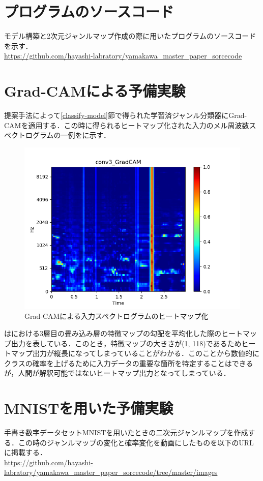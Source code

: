 \appendix
\chapter{プログラムのソースコード}
モデル構築と2次元ジャンルマップ作成の際に用いたプログラムのソースコードを示す．\\
\url{https://github.com/hayashi-labratory/yamakawa_master_paper_sorcecode}


\chapter{Grad-CAMによる予備実験}
提案手法によって\ref{classify-model}節で得られた学習済ジャンル分類器にGrad-CAMを適用する．この時に得られるヒートマップ化された入力のメル周波数スペクトログラムの一例をに示す．
\begin{figure}[htbp]
	\begin{center}
		\includegraphics[scale=0.7]{./images/appendix/6_gradcam.png}
		\caption{Grad-CAMによる入力スペクトログラムのヒートマップ化}
		\label{fig:grad-cam-mel}
	\end{center}
\end{figure}


はにおける3層目の畳み込み層の特徴マップの勾配を平均化した際のヒートマップ出力を表している．このとき，特徴マップの大きさが(1, 118)であるためヒートマップ出力が縦長になってしまっていることがわかる．このことから数値的にクラスの確率を上げるために入力データの重要な箇所を特定することはできるが，人間が解釈可能ではないヒートマップ出力となってしまっている．

\chapter{MNISTを用いた予備実験}
手書き数字データセットMNISTを用いたときの二次元ジャンルマップを作成する．この時のジャンルマップの変化と確率変化を動画にしたものを以下のURLに掲載する．\\
\url{https://github.com/hayashi-labratory/yamakawa_master_paper_sorcecode/tree/master/images}
